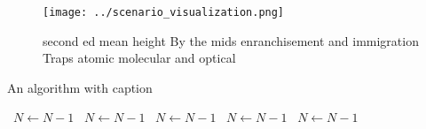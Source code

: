 \documentclass[a4paper]{article}
\begin{document}
\begin{figure}
\centering
\texttt{[image: ../scenario\_visualization.png]}
\caption{second ed mean height By the mids enranchisement and immigration Traps atomic molecular and optical
}
\end{figure}
 
\begin{algorithm}
\caption{An algorithm with caption}
\begin{algorithmic}
\    \State $N \gets N - 1$
\    \State $N \gets N - 1$
\    \State $N \gets N - 1$
\    \State $N \gets N - 1$
\    \State $N \gets N - 1$
\EndWhile
\end{algorithmic}
\end{algorithm}
\end{document}
